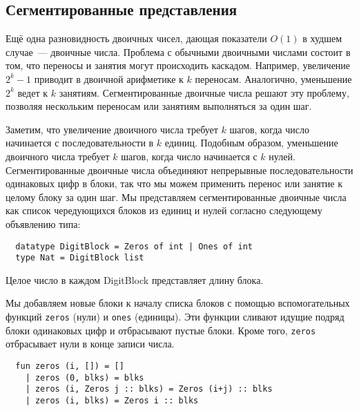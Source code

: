 \subsection{Сегментированные представления}
\label{sc:9.2.4}

\begin{frame}[fragile]{}


Ещё одна разновидность двоичных чисел, дающая показатели $O(1)$ в
худшем случае~---  двоичные
числа. Проблема с обычными двоичными числами состоит в том, что
переносы и занятия могут происходить каскадом. Например, увеличение
$2^k - 1$ приводит в двоичной арифметике к $k$ переносам. Аналогично,
уменьшение $2^k$ ведет к $k$ занятиям. Сегментированные двоичные числа
решают эту проблему, позволяя нескольким переносам или занятиям
выполняться за один шаг.

Заметим, что увеличение двоичного числа требует $k$ шагов, когда число
начинается с последовательности в $k$ единиц. Подобным образом,
уменьшение двоичного числа требует $k$ шагов, когда число начинается
с $k$ нулей. Сегментированные двоичные числа объединяют непрерывные
последовательности одинаковых цифр в блоки, так что мы можем применить
перенос или занятие к целому блоку за один шаг. Мы представляем
сегментированные двоичные числа как список чередующихся блоков из
единиц и нулей согласно следующему объявлению типа:
\begin{lstlisting}
  datatype DigitBlock = Zeros of int | Ones of int
  type Nat = DigitBlock list
\end{lstlisting}
Целое число в каждом DigitBlock представляет длину блока.

Мы добавляем новые блоки к началу списка блоков с помощью
вспомогательных функций
\lstinline!zeros! (нули) и \lstinline!ones! (единицы). Эти функции
сливают идущие подряд блоки одинаковых цифр и отбрасывают
пустые блоки.  Кроме того, \lstinline!zeros! отбрасывает нули в конце
записи числа.
\begin{lstlisting}
  fun zeros (i, []) = []
    | zeros (0, blks) = blks
    | zeros (i, Zeros j :: blks) = Zeros (i+j) :: blks
    | zeros (i, blks) = Zeros i :: blks


\end{lstlisting}
\end{frame}
